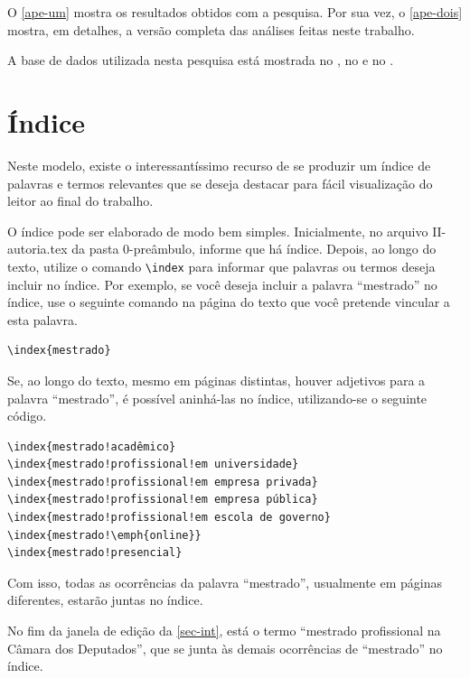 O \autoref{ape-um} mostra os resultados obtidos com a pesquisa. Por sua vez, o \autoref{ape-dois} mostra, em detalhes, a versão completa das análises feitas neste trabalho.

A base de dados utilizada nesta pesquisa está mostrada no , no  e no .

\section{Índice}\label{sec-ind}

Neste modelo, existe o interessantíssimo recurso de se produzir um índice de palavras e termos relevantes que se deseja destacar para fácil visualização do leitor ao final do trabalho.

O índice pode ser elaborado de modo bem simples. Inicialmente, no arquivo \textsf{II-autoria.tex} da pasta \textsf{0-preâmbulo}, informe que há índice. Depois, ao longo do texto, utilize o comando \verb|\index| para informar que palavras ou termos deseja incluir no índice. Por exemplo, se você deseja incluir a palavra ``mestrado'' no índice, use o seguinte comando na página do texto que você pretende vincular a esta palavra.

\begin{verbatim}
\index{mestrado}
\end{verbatim}

Se, ao longo do texto, mesmo em páginas distintas, houver adjetivos para a palavra ``mestrado'', é possível aninhá-las no índice, utilizando-se o seguinte código.

\begin{verbatim}
\index{mestrado!acadêmico}
\index{mestrado!profissional!em universidade}
\index{mestrado!profissional!em empresa privada}
\index{mestrado!profissional!em empresa pública}
\index{mestrado!profissional!em escola de governo}
\index{mestrado!\emph{online}}
\index{mestrado!presencial}
\end{verbatim}

Com isso, todas as ocorrências da palavra ``mestrado'', usualmente em páginas diferentes, estarão juntas no índice.

No fim da janela de edição da \autoref{sec-int}, está o termo ``mestrado profissional na Câmara dos Deputados'', que se junta às demais ocorrências de ``mestrado'' no índice.

